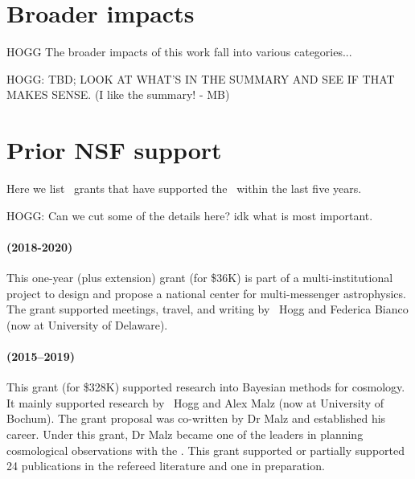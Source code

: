 \documentclass[12pt, letterpaper]{article}
\begin{document}
\section{Broader impacts}

HOGG The broader impacts of this work fall into various categories...

HOGG: TBD; LOOK AT WHAT'S IN THE SUMMARY AND SEE IF THAT MAKES SENSE. (I like the summary! - MB)

\section{Prior NSF support}

Here we list \NSF\ grants that have supported the \PI\ within the last five years.

HOGG: Can we cut some of the details here? idk what is most important.

\paragraph{
 (2018-2020)}
This one-year (plus extension) grant (for \$36K) is part of a multi-institutional project
to design and propose a national center for multi-messenger astrophysics. The grant supported
meetings, travel, and writing by \PI\ Hogg and Federica Bianco (now at University of Delaware).

\paragraph{
(2015--2019)} This grant (for \$328K) supported research into Bayesian
methods for cosmology. It mainly supported research by \PI\ Hogg and
Alex Malz (now at University of Bochum). The grant proposal was co-written
by Dr Malz and established his career.
Under this grant, Dr Malz became one of the leaders in planning cosmological
observations with the .
This grant supported or partially supported 24 publications
in the refereed literature and one in preparation.
\end{document}

